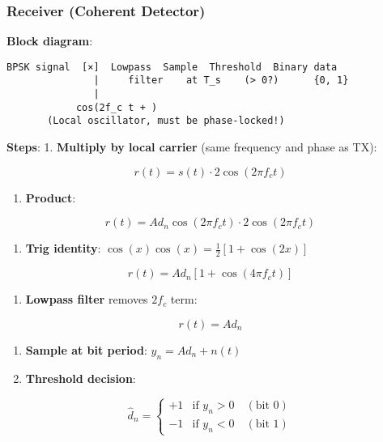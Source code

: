 \subsubsection{Receiver (Coherent
Detector)}\label{receiver-coherent-detector}

\textbf{Block diagram}:

\begin{verbatim}
BPSK signal  [×]  Lowpass  Sample  Threshold  Binary data
               |     filter    at T_s    (> 0?)      {0, 1}
               |
            cos(2f_c t + )
       (Local oscillator, must be phase-locked!)
\end{verbatim}

\textbf{Steps}: 1. \textbf{Multiply by local carrier} (same frequency
and phase as TX):

\[
r(t) = s(t) \cdot 2\cos(2\pi f_c t)
\]

\begin{enumerate}
\def\labelenumi{\arabic{enumi}.}
\setcounter{enumi}{1}
\tightlist
\item
  \textbf{Product}:
\end{enumerate}

\[
r(t) = A d_n \cos(2\pi f_c t) \cdot 2\cos(2\pi f_c t)
\]

\begin{enumerate}
\def\labelenumi{\arabic{enumi}.}
\setcounter{enumi}{2}
\tightlist
\item
  \textbf{Trig identity}: \(\cos(x)\cos(x) = \frac{1}{2}[1 + \cos(2x)]\)
\end{enumerate}

\[
r(t) = A d_n [1 + \cos(4\pi f_c t)]
\]

\begin{enumerate}
\def\labelenumi{\arabic{enumi}.}
\setcounter{enumi}{3}
\tightlist
\item
  \textbf{Lowpass filter} removes \(2f_c\) term:
\end{enumerate}

\[
r(t) = A d_n
\]

\begin{enumerate}
\def\labelenumi{\arabic{enumi}.}
\setcounter{enumi}{4}
\item
  \textbf{Sample at bit period}: \(y_n = A d_n + n(t)\)
\item
  \textbf{Threshold decision}:
\end{enumerate}

\[
\hat{d}_n = \begin{cases}
+1 & \text{if } y_n > 0 \quad (\text{bit } 0) \\
-1 & \text{if } y_n < 0 \quad (\text{bit } 1)
\end{cases}
\]

